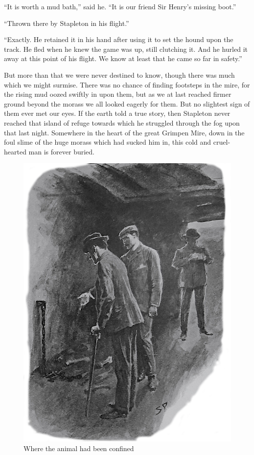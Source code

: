 \documentclass[paper=a5,BCOR=7mm,twoside,DIV=calc,12pt,usegeometry,openany,chapterprefix,endperiod,headings=big]{scrbook} %
\begin{document}
\enquote{It is worth a mud bath,} said he. \enquote{It is our friend Sir Henry's missing boot.}

\enquote{Thrown there by Stapleton in his flight.}

\enquote{Exactly. He retained it in his hand after using it to set the hound upon the track. He fled when he knew the game was up, still clutching it. And he hurled it away at this point of his flight. We know at least that he came so far in safety.}

But more than that we were never destined to know, though there was much which we might surmise. There was no chance of finding footsteps in the mire, for the rising mud oozed swiftly in upon them, but as we at last reached firmer ground beyond the morass we all looked eagerly for them. But no slightest sign of them ever met our eyes. If the earth told a true story, then Stapleton never reached that island of refuge towards which he struggled through the fog upon that last night. Somewhere in the heart of the great Grimpen Mire, down in the foul slime of the huge morass which had sucked him in, this cold and cruel-hearted man is forever buried.

\begin{figure}[h!]
\centering
\includegraphics[width=0.8\linewidth]{14_creatureconfined}
\caption{Where the animal had been confined}
\end{figure}
\end{document}
